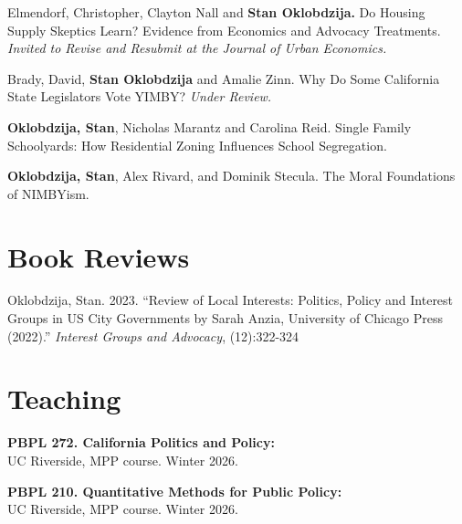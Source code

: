 \documentclass[margin,line]{res}
\begin{document}
\begin{resume}
Elmendorf, Christopher, Clayton Nall and \textbf{Stan Oklobdzija.} Do Housing Supply Skeptics Learn? Evidence from Economics and Advocacy Treatments. \textit{Invited to Revise and Resubmit at the Journal of
Urban Economics.}

Brady, David, \textbf{Stan Oklobdzija} and Amalie Zinn. Why Do Some California State Legislators Vote YIMBY? \textit{Under Review.}

\textbf{Oklobdzija, Stan}, Nicholas Marantz and Carolina Reid. Single Family Schoolyards: How Residential Zoning Influences School Segregation.

\textbf{Oklobdzija, Stan}, Alex Rivard, and Dominik Stecula. The Moral Foundations of NIMBYism.








\section{Book Reviews}
Oklobdzija, Stan. 2023. ``Review of Local Interests: Politics, Policy and Interest Groups in US City Governments by Sarah Anzia, University of Chicago Press (2022).'' \textit{Interest Groups and Advocacy}, (12):322-324 




\section{\sc Teaching} 

{\bf PBPL 272. California Politics and Policy:}\\
UC Riverside, MPP course. Winter 2026.

{\bf PBPL 210. Quantitative Methods for Public Policy:}\\
UC Riverside, MPP course. Winter 2026.


\end{resume}
\end{document}

